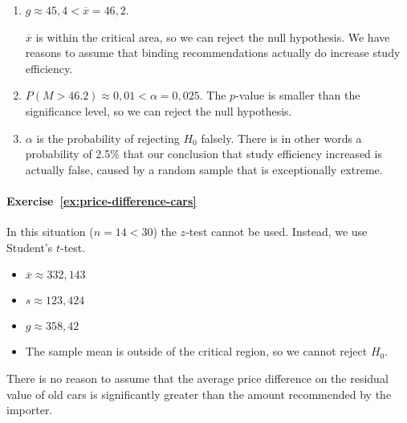 \begin{enumerate}
  \item $g \approx 45,4 < \overline{x} = 46,2$.
  
  $\overline{x}$ is within the critical area, so we can reject the null hypothesis. We have reasons to assume that binding recommendations actually do increase study efficiency. 
  
  \item $P(M > 46.2) \approx 0,01 < \alpha = 0,025$. The $p$-value is smaller than the significance level, so we can reject the null hypothesis.
  
  \item  $\alpha$ is the probability of rejecting $H_{0}$ falsely. There is in other words a probability of 2.5\% that our conclusion that study efficiency increased is actually false, caused by a random sample that is exceptionally extreme.
\end{enumerate}

\paragraph{Exercise~\ref{ex:price-difference-cars}}

In this situation ($n = 14 < 30$) the $z$-test cannot be used. Instead, we use Student's $t$-test.

\begin{itemize}
  \item $\overline{x} \approx 332,143$
  \item $s \approx 123,424$
  \item $g \approx 358,42$
  \item The sample mean is outside of the critical region, so we cannot reject $H_0$.
\end{itemize}

There is no reason to assume that the average price difference on the residual value of old cars is significantly greater than the amount recommended by the importer.
